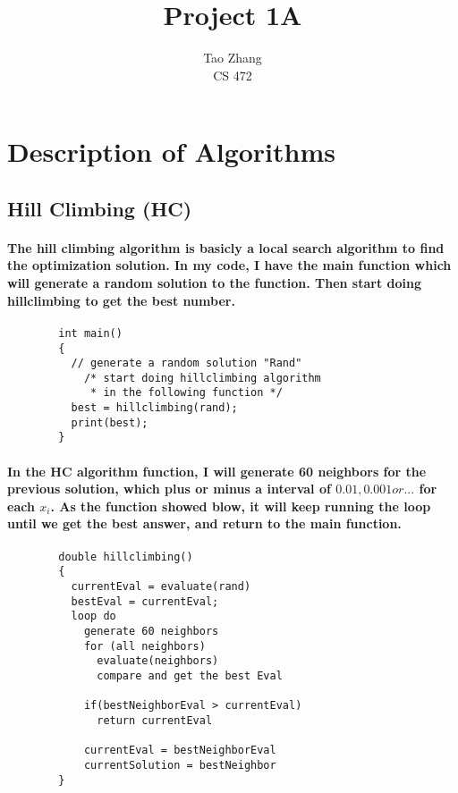 \documentclass[12pt]{article}
\begin{document}
\title{Project 1A}

\author{Tao Zhang\\
CS 472}

\maketitle

\section{Description of Algorithms}
	\subsection{Hill Climbing (HC)}
	\paragraph{The hill climbing algorithm is basicly a local search algorithm to find the optimization solution. In my code, I have the main function which will generate a random solution to the function. Then start doing hillclimbing to get the best number.}
	\begin{verbatim}
		int main()
		{
		  // generate a random solution "Rand"
		  	/* start doing hillclimbing algorithm 
		  	 * in the following function */
		  best = hillclimbing(rand);
		  print(best);
		}
	\end{verbatim}
	

	\paragraph{In the HC algorithm function, I will generate 60 neighbors for the previous solution, which plus or minus a interval of $0.01, 0.001 or ...$ for each $x_i$. As the function showed blow, it will keep running the loop until we get the best answer, and return to the main function.}
	\begin{verbatim}
		double hillclimbing()
		{
		  currentEval = evaluate(rand)
		  bestEval = currentEval;
		  loop do
		    generate 60 neighbors
		    for (all neighbors)
		      evaluate(neighbors)
		      compare and get the best Eval
				
		    if(bestNeighborEval > currentEval)
		      return currentEval
				
		    currentEval = bestNeighborEval
		    currentSolution = bestNeighbor
		}
	\end{verbatim}
	
\end{document}
